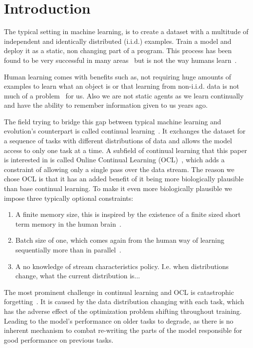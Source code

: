 \documentclass[oneside]{ctuthesis}
\begin{document}
\maketitle
\chapter{Introduction}

The typical setting in machine learning, is to create a dataset with a multitude of independent and identically distributed (i.i.d.) examples. Train a model and deploy it as a static, non changing part of a program. This process has been found to be very successful in many areas~\cite{usesOfAI} but is not the way humans learn~\cite{Sigman7585}.

Human learning comes with benefits such as, not requiring huge amounts of examples to learn what an object is or that learning from non-i.i.d. data is not much of a problem~\cite{PARISI201954} for us. Also we are not static agents as we learn continually and have the ability to remember information given to us years ago. 

The field trying to bridge this gap between typical machine learning and evolution's counterpart is called continual learning~\cite{clsurvey}. It exchanges the dataset for a sequence of tasks with different distributions of data and allows the model access to only one task at a time. A subfield of continual learning that this paper is interested in is called Online Continual Learning (OCL)~\cite{oclsurvey_graphs}, which adds a constraint of allowing only a single pass over the data stream. 
The reason we chose OCL is that it has an added benefit of it being more biologically plausible than base continual learning. To make it even more biologically plausible we impose three typically optional constraints:
\begin{enumerate}
    \item A finite memory size, this is inspired by the existence of a finite sized short term memory in the human brain~\cite{VALLAR200114049}. 
    \item Batch size of one, which comes again from the human way of learning sequentially more than in parallel~\cite{Sigman7585}. 
    \item A no knowledge of stream characteristics policy. I.e. when distributions change, what the current distribution is...
\end{enumerate}

The most prominent challenge in continual learning and OCL is catastrophic forgetting~\cite{clsurvey}. It is caused by the data distribution changing with each task, which has the adverse effect of the optimization problem shifting throughout training. Leading to the model's performance on older tasks to degrade, as there is no inherent mechanism to combat re-writing the parts of the model responsible for good performance on previous tasks. 
\end{document}
